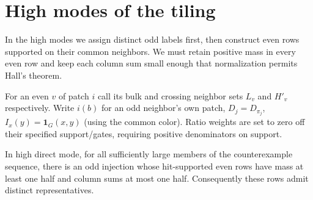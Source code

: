 \section{High modes of the tiling}
\label{sec:high-modes-of-the-tiling}

In the high modes we assign distinct odd labels first, then construct even rows supported on their common neighbors. We must retain positive mass in every even row and keep each column sum small enough that normalization permits Hall's theorem.

For an even \(v\) of patch \(i\) call its bulk and crossing neighbor sets \(L_v\) and \(H'_v\) respectively. Write \(i(b)\) for an odd neighbor's own patch, \(D_j=D_{\pi_j}\), \(I_x(y)=\mathbf1_G(x,y)\) (using the common color). Ratio weights are set to zero off their specified support/gates, requiring positive denominators on support.

\begin{lemma}\label{lem:high-direct-assignment}
In high direct mode, for all sufficiently large members of the counterexample sequence, there is an odd injection whose hit-supported even rows have mass at least one half and column sums at most one half. Consequently these rows admit distinct representatives.
\end{lemma}

